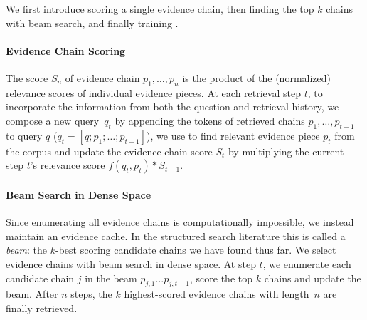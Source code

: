 We first introduce scoring a single evidence chain, then finding the
top $k$ chains with beam search, and finally training \name{}.
%
%


\paragraph{Evidence Chain Scoring}

The score $S_{n}$ of evidence chain ${p_{1},\dots,p_{n}}$ is the product of the
(normalized) relevance scores of individual evidence pieces.
%
At each retrieval step $t$, 
to incorporate the information from both the question and retrieval history, we compose  
a new query~$q_{t}$ by appending the tokens of retrieved chains $p_{1},\dots,p_{t - 1}$ 
to query $q$ ($q_t=[q;p_{1};\dots;p_{t-1}]$), we use  
to find relevant evidence piece $p_t$ from the corpus and update the
evidence chain score $S_t$ by multiplying the
current step $t$'s relevance score $f (q_{t}, p_{t}) * S_{t -1}$.




\paragraph{Beam Search in Dense Space}


Since enumerating all evidence chains is computationally impossible,
%
we instead maintain an evidence cache.
%
In the structured search literature this is called a \emph{beam}:
the $k$-best scoring candidate chains we have found thus far.
%
%
%
We select evidence chains with beam search in dense space.  At step
$t$, we enumerate each candidate chain $j$ in the beam $p_{j,
  1}...p_{j, t - 1}$, score the top $k$ chains and update the beam.
After $n$ steps, the $k$ highest-scored evidence chains with
length~$n$ are finally retrieved.


